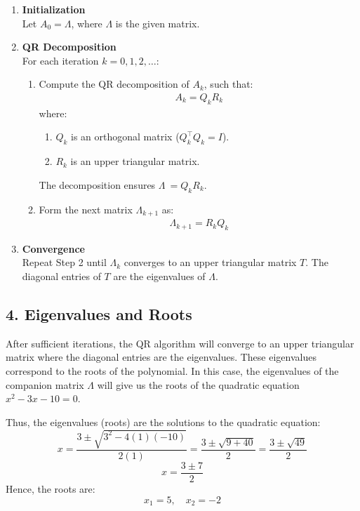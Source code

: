 \documentclass[journal]{IEEEtran}
\begin{document}
\begin{enumerate}
    \item \textbf{Initialization}\\
    Let \(A_0 = \Lambda\), where \(\Lambda\) is the given matrix.
    \item \textbf{QR Decomposition}\\
    For each iteration \(k = 0, 1, 2, \dots\):
    \begin{enumerate}
        \item Compute the QR decomposition of \(A_k\), such that:
        \begin{align}
        A_k = Q_k R_k \tag{1.17}
        \end{align}
        where:
        \begin{enumerate}
            \item \(Q_k\) is an orthogonal matrix (\(Q_k^\top Q_k = I\)).
            \item \(R_k\) is an upper triangular matrix.
        \end{enumerate}
        The decomposition ensures \(\Lambda\ = Q_k R_k\).
        \item Form the next matrix \(\Lambda_{k+1}\) as:
        \begin{align}
        \Lambda_{k+1} = R_k Q_k \tag{1.18}
        \end{align}
    \end{enumerate}
    \item \textbf{Convergence}\\
    Repeat Step 2 until \(\Lambda_k\) converges to an upper triangular matrix \(T\). The diagonal entries of \(T\) are the eigenvalues of \(\Lambda\).
\end{enumerate}
\subsection*{4. Eigenvalues and Roots}
After sufficient iterations, the QR algorithm will converge to an upper triangular matrix where the diagonal entries are the eigenvalues. These eigenvalues correspond to the roots of the polynomial. In this case, the eigenvalues of the companion matrix \( \Lambda \) will give us the roots of the quadratic equation \( x^2 - 3x - 10 = 0 \).

Thus, the eigenvalues (roots) are the solutions to the quadratic equation:
\[
x = \frac{3 \pm \sqrt{3^2 - 4(1)(-10)}}{2(1)} = \frac{3 \pm \sqrt{9 + 40}}{2} = \frac{3 \pm \sqrt{49}}{2}
\]
\[
x = \frac{3 \pm 7}{2}
\]
Hence, the roots are:
\[
x_1 = 5, \quad x_2 = -2
\]
\end{document}
